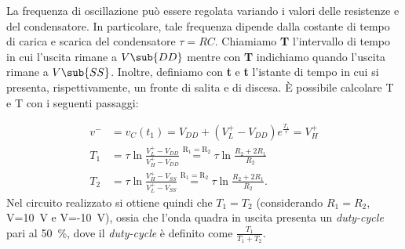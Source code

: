La frequenza di oscillazione può essere regolata variando i valori delle resistenze e del condensatore. In particolare, tale frequenza dipende dalla costante di tempo di carica e scarica del condensatore $\tau=RC$. Chiamiamo \textbf{T} l'intervallo di tempo in cui l'uscita rimane a $V\sub{DD}$ mentre con \textbf{T} indichiamo quando l'uscita rimane a $V\sub{SS}$. Inoltre, definiamo con \textbf{t} e \textbf{t} l'istante di tempo in cui si presenta, rispettivamente, un fronte di salita e di discesa. \`E possibile calcolare T e T con i seguenti passaggi:

\begin{equation}
	\begin{split}
		v^-&=v_C(t_1)=V_{DD}+(V_L^+-V_{DD})e^{\frac{T_1}{\tau}}=V_H^+ \\
		T_1&=\tau \ln{\frac{V_L^+-V_{DD}}{V_H^+-V_{DD}}}\overset{\mathrm{R_1=R_2}}{=}\tau \ln{\frac{R_2+2R_1}{R_2}} \\
		T_2&=\tau \ln{\frac{V_H^+-V_{SS}}{V_L^+-V_{SS}}}\overset{\mathrm{R_1=R_2}}{=}\tau \ln{\frac{R_2+2R_1}{R_2}}.
	\end{split}
	\label{eq:t1_t2_3}
\end{equation}
Nel circuito realizzato si ottiene quindi che $T_1=T_2$ (considerando $R_1=R_2$, V=\SI{10}{\volt} e V=-\SI{10}{\volt}), ossia che l'onda quadra in uscita presenta un \textit{duty-cycle} pari al \SI{50}{\percent}, dove il \textit{duty-cycle} è definito come $\frac{T_1}{T_1+T_2}$.

